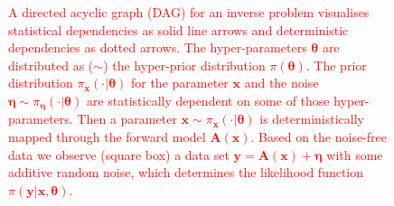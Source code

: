 \documentclass{article}
\begin{document}
\begin{figure}[ht!]
	\centering
	\caption[Hierarchical Bayesian Model]{\textcolor{red}{A directed acyclic graph (DAG) for an inverse problem visualises statistical dependencies as solid line arrows and deterministic dependencies as dotted arrows.
		The hyper-parameters $\bm{\theta}$ are distributed as ($\sim$) the hyper-prior distribution $\pi(\bm{\theta})$.
		The prior distribution $ \pi_{\bm{x}}(\cdot|\bm{\theta})$ for the parameter $\bm{x}$ and the noise  $\bm{\eta} \sim \pi_{\bm{\eta}}(\cdot|\bm{\theta})$ are statistically dependent on some of those hyper-parameters.
		Then a parameter $\bm{x} \sim \pi_{\bm{x}}(\cdot|\bm{\theta})$ is deterministically mapped through the forward model $\bm{A}(\bm{x})$.
		Based on the noise-free data we observe (square box) a data set $\bm{y} = \bm{A}(\bm{x}) + \bm{\eta}$ with some additive random noise, which determines the likelihood function $\pi(\bm{y}|\bm{x},\bm{\theta})$.}}
	\label{fig:FirstDAG}
\end{figure}
\end{document}
